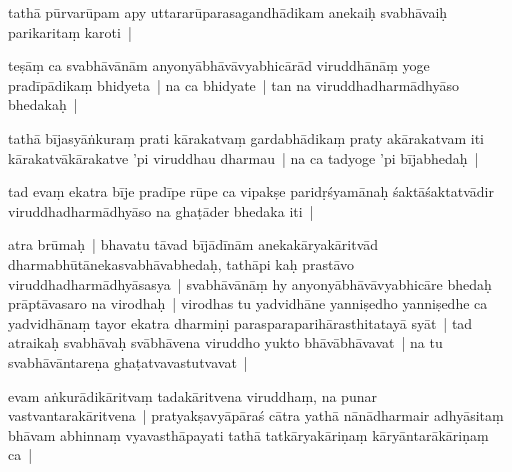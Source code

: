 \documentclass[article,12pt,a4paper]{memoir}%
\newcounter{parCount}
\begin{document}
	  
	  \pstart \leavevmode%
	\label{thakur75-77.28a}tathā pūrvarūpam apy uttararūparasagandhādikam anekaiḥ svabhāvaiḥ parikaritaṃ karoti | 
	{}
	\pend%
      

	  
	  \pstart \leavevmode%
	\label{thakur75-77.29}teṣāṃ ca svabhāvānām anyonyābhāvāvyabhicārād viruddhānāṃ yoge pradīpādikaṃ bhidyeta | na ca bhidyate | tan na viruddhadharmādhyāso bhedakaḥ | 
	{}
	\pend%
      

	  
	  \pstart \leavevmode%
	\label{thakur75-78.1}tathā bījasyāṅkuraṃ prati kārakatvaṃ gardabhādikaṃ praty akārakatvam iti kārakatvākārakatve 'pi viruddhau dharmau | na ca tadyoge 'pi bījabhedaḥ | 
	{}
	\pend%
      

	  
	  \pstart \leavevmode%
	\label{thakur75-78.3}tad evaṃ ekatra bīje pradīpe rūpe ca vipakṣe paridṛśyamānaḥ śaktāśaktatvādir viruddhadharmādhyāso na ghaṭāder bhedaka iti |
	{}
	\pend%
      

	  
	  \pstart \leavevmode%
	\label{thakur75-78.5}atra brūmaḥ | bhavatu tāvad bījādīnām anekakāryakāritvād dharmabhūtānekasvabhāvabhedaḥ, tathāpi kaḥ prastāvo viruddhadharmādhyāsasya | svabhāvānāṃ hy anyonyābhāvāvyabhicāre bhedaḥ prāptāvasaro na virodhaḥ | virodhas tu yadvidhāne yanniṣedho yanniṣedhe ca yadvidhānaṃ tayor ekatra dharmiṇi parasparaparihārasthitatayā syāt | tad atraikaḥ svabhāvaḥ svābhāvena viruddho yukto bhāvābhāvavat | na tu svabhāvāntareṇa ghaṭatvavastutvavat | 
	{}
	\pend%
      

	  
	  \pstart \leavevmode%
	\label{thakur75-78.10}evam aṅkurādikāritvaṃ tadakāritvena viruddhaṃ, na punar vastvantarakāritvena | pratyakṣavyāpāraś cātra yathā nānādharmair adhyāsitaṃ bhāvam abhinnaṃ vyavasthāpayati tathā tatkāryakāriṇaṃ kāryāntarākāriṇaṃ ca | 
	{}
	\pend%
      
\end{document}
